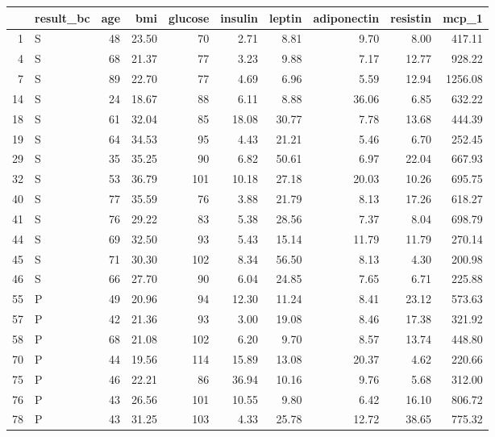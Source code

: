 \begin{table}[ht]
\centering
\begin{tabular}{rlrrrrrrrr}
  \hline
 & result\_bc & age & bmi & glucose & insulin & leptin & adiponectin & resistin & mcp\_1 \\ 
  \hline
1 & S &  48 & 23.50 &  70 & 2.71 & 8.81 & 9.70 & 8.00 & 417.11 \\ 
  4 & S &  68 & 21.37 &  77 & 3.23 & 9.88 & 7.17 & 12.77 & 928.22 \\ 
  7 & S &  89 & 22.70 &  77 & 4.69 & 6.96 & 5.59 & 12.94 & 1256.08 \\ 
  14 & S &  24 & 18.67 &  88 & 6.11 & 8.88 & 36.06 & 6.85 & 632.22 \\ 
  18 & S &  61 & 32.04 &  85 & 18.08 & 30.77 & 7.78 & 13.68 & 444.39 \\ 
  19 & S &  64 & 34.53 &  95 & 4.43 & 21.21 & 5.46 & 6.70 & 252.45 \\ 
  29 & S &  35 & 35.25 &  90 & 6.82 & 50.61 & 6.97 & 22.04 & 667.93 \\ 
  32 & S &  53 & 36.79 & 101 & 10.18 & 27.18 & 20.03 & 10.26 & 695.75 \\ 
  40 & S &  77 & 35.59 &  76 & 3.88 & 21.79 & 8.13 & 17.26 & 618.27 \\ 
  41 & S &  76 & 29.22 &  83 & 5.38 & 28.56 & 7.37 & 8.04 & 698.79 \\ 
  44 & S &  69 & 32.50 &  93 & 5.43 & 15.14 & 11.79 & 11.79 & 270.14 \\ 
  45 & S &  71 & 30.30 & 102 & 8.34 & 56.50 & 8.13 & 4.30 & 200.98 \\ 
  46 & S &  66 & 27.70 &  90 & 6.04 & 24.85 & 7.65 & 6.71 & 225.88 \\ 
  55 & P &  49 & 20.96 &  94 & 12.30 & 11.24 & 8.41 & 23.12 & 573.63 \\ 
  57 & P &  42 & 21.36 &  93 & 3.00 & 19.08 & 8.46 & 17.38 & 321.92 \\ 
  58 & P &  68 & 21.08 & 102 & 6.20 & 9.70 & 8.57 & 13.74 & 448.80 \\ 
  70 & P &  44 & 19.56 & 114 & 15.89 & 13.08 & 20.37 & 4.62 & 220.66 \\ 
  75 & P &  46 & 22.21 &  86 & 36.94 & 10.16 & 9.76 & 5.68 & 312.00 \\ 
  76 & P &  43 & 26.56 & 101 & 10.55 & 9.80 & 6.42 & 16.10 & 806.72 \\ 
  78 & P &  43 & 31.25 & 103 & 4.33 & 25.78 & 12.72 & 38.65 & 775.32 \\ 

\end{tabular}
\end{table}
